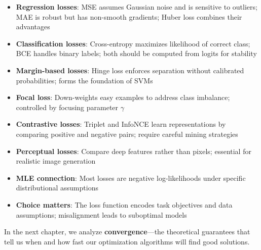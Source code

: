\documentclass[../../main.tex]{subfiles}
\begin{document}
\begin{itemize}
    \item \textbf{Regression losses}: MSE assumes Gaussian noise and is sensitive to outliers; MAE is robust but has non-smooth gradients; Huber loss combines their advantages

    \item \textbf{Classification losses}: Cross-entropy maximizes likelihood of correct class; BCE handles binary labels; both should be computed from logits for stability

    \item \textbf{Margin-based losses}: Hinge loss enforces separation without calibrated probabilities; forms the foundation of SVMs

    \item \textbf{Focal loss}: Down-weights easy examples to address class imbalance; controlled by focusing parameter $\gamma$

    \item \textbf{Contrastive losses}: Triplet and InfoNCE learn representations by comparing positive and negative pairs; require careful mining strategies

    \item \textbf{Perceptual losses}: Compare deep features rather than pixels; essential for realistic image generation

    \item \textbf{MLE connection}: Most losses are negative log-likelihoods under specific distributional assumptions

    \item \textbf{Choice matters}: The loss function encodes task objectives and data assumptions; misalignment leads to suboptimal models
\end{itemize}

In the next chapter, we analyze \textbf{convergence}---the theoretical guarantees that tell us when and how fast our optimization algorithms will find good solutions.
\end{document}

